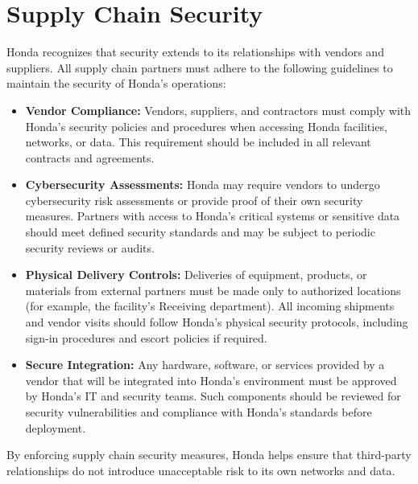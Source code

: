\section{Supply Chain Security}
Honda recognizes that security extends to its relationships with vendors and suppliers. All supply chain partners must adhere to the following guidelines to maintain the security of Honda's operations:
\begin{itemize}
    \item \textbf{Vendor Compliance:} Vendors, suppliers, and contractors must comply with Honda's security policies and procedures when accessing Honda facilities, networks, or data. This requirement should be included in all relevant contracts and agreements.
    \item \textbf{Cybersecurity Assessments:} Honda may require vendors to undergo cybersecurity risk assessments or provide proof of their own security measures. Partners with access to Honda's critical systems or sensitive data should meet defined security standards and may be subject to periodic security reviews or audits.
    \item \textbf{Physical Delivery Controls:} Deliveries of equipment, products, or materials from external partners must be made only to authorized locations (for example, the facility's Receiving department). All incoming shipments and vendor visits should follow Honda's physical security protocols, including sign-in procedures and escort policies if required.
    \item \textbf{Secure Integration:} Any hardware, software, or services provided by a vendor that will be integrated into Honda's environment must be approved by Honda's IT and security teams. Such components should be reviewed for security vulnerabilities and compliance with Honda's standards before deployment.
\end{itemize}
By enforcing supply chain security measures, Honda helps ensure that third-party relationships do not introduce unacceptable risk to its own networks and data.

